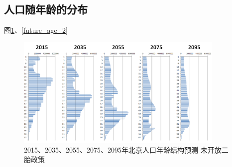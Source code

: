 \documentclass[a4paper]{article}
\begin{document}
\subsection{人口随年龄的分布}
图\ref{future_age_1}、\ref{future_age_2}
	\begin{figure}[htbp]
		\centering
		\includegraphics[width=10cm]{pics/future_age_1.png}
		\caption{2015、2035、2055、2075、2095年北京人口年龄结构预测 未开放二胎政策} 
		\label{future_age_1}	
	\end{figure}
\end{document}
